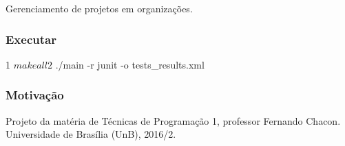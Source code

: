 \href{https://travis-ci.org/Dayof/project-management}{\tt }

Gerenciamento de projetos em organizações.

\subsubsection*{Executar}


\begin{DoxyCode}
1 $ make all
2 $ ./main -r junit -o tests\_results.xml
\end{DoxyCode}


\subsubsection*{Motivação}

Projeto da matéria de Técnicas de Programação 1, professor Fernando Chacon.  Universidade de Brasília (UnB), 2016/2. 